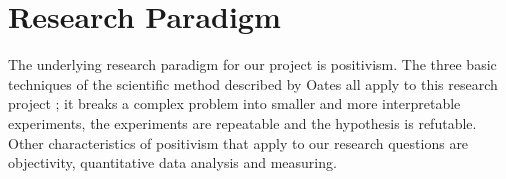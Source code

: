 \section*{Research Paradigm}
The underlying research paradigm for our project is positivism. The three basic techniques of the scientific method described by Oates all apply to this research project \cite{oates}; it breaks a complex problem into smaller and more interpretable experiments, the experiments are repeatable and the hypothesis is refutable. Other characteristics of positivism that apply to our research questions are objectivity, quantitative data analysis and measuring.


\begin{comment}
"Experiments [...] is at the heart of scientific method and positivism"

C17: Discuss and reflect upon the research paradigm you have employed, and why
\end{comment}


